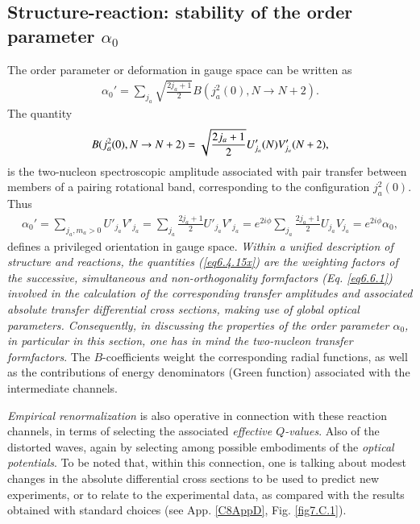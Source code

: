 \subsection{Structure-reaction: stability of the order parameter $\alpha_0$}\label{C6S2.3}
The order parameter or deformation in gauge space can be written as 
\begin{align}\label{eq7.2.1}
\alpha_0'=\sum_{j_a}\sqrt{\frac{2j_a+1}{2}}B(j^2_a(0),N\to N+2).
\end{align}
The quantity
\begin{align}\label{eq6.4.15x}
B(j^2_a(0),N\to N+2)=\sqrt{\frac{2j_a+1}{2}}U'_{j_a}(N)V'_{j_a}(N+2), \idx{Pairing rotational bands!two-nucleon transfer spectroscopic amplitudes}
\end{align}
is the two-nucleon spectroscopic amplitude associated with pair transfer between members of a pairing rotational band, corresponding to the configuration $j_a^2(0)$. Thus
\begin{align}\label{eq6.4.15}
\alpha_0'=\sum_{j_a,m_a>0}U'_{j_a}V'_{j_a}=\sum_{j_a}\frac{2j_a+1}{2}U'_{j_a}V'_{j_a}=e^{2i\phi}\sum_{j_a}\frac{2j_a+1}{2}U_{j_a}V_{j_a}=e^{2i\phi}\alpha_0,
\end{align}
defines a privileged orientation in gauge space. \textit{Within a unified description of structure and reactions, the quantities (\ref{eq6.4.15x}) are the weighting factors of the successive, simultaneous and non-orthogonality formfactors (Eq. \ref{eq6.6.1}) involved in the calculation of the corresponding transfer amplitudes and associated absolute transfer differential cross sections, making use of global optical parameters. Consequently, in discussing the properties of the order parameter $\alpha_0$, in particular in this section, one has in mind the two-nucleon transfer formfactors}.  The $B$-coefficients weight the corresponding radial functions, as well as the contributions of energy denominators (Green function) associated with the  intermediate channels.




 \textit{Empirical renormalization} is also operative in connection with these reaction channels, in terms of selecting the associated \emph{effective $Q$-values}. Also of the distorted waves, again by selecting among possible embodiments of the \textit{optical potentials}. To be noted that, within this connection, one is talking about  modest changes in the absolute differential cross sections to be used to predict new experiments, or to relate to the experimental data, as compared with the results obtained with standard choices (see  App. \ref{C8AppD}, Fig. \ref{fig7.C.1}).

